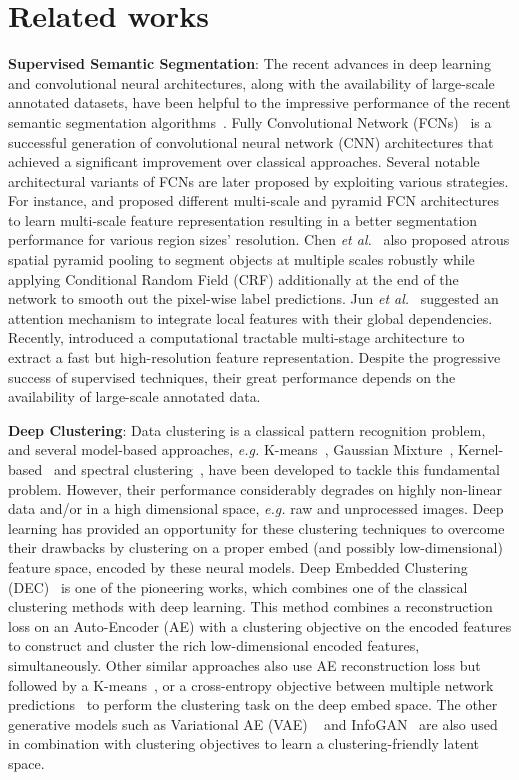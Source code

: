\documentclass[letterpaper, 10 pt, journal, twoside]{IEEEtran}
\newcommand{\eg}{\emph{e.g.}\xspace}
\newcommand{\etal}{\emph{et al.}\xspace}
\begin{document}
\section{Related works} \label{sec:ReWo}
\textbf{Supervised Semantic Segmentation}: The recent advances in deep learning and convolutional neural architectures, along with the availability of large-scale annotated datasets, have been helpful to the impressive performance of the recent semantic segmentation algorithms~\cite{ReviewSS2020}. Fully Convolutional Network (FCNs)~\cite{FCN} is a successful generation of convolutional neural network (CNN) architectures that achieved a significant improvement over classical approaches. Several notable architectural variants of FCNs are later proposed by exploiting various strategies. For instance, \cite{RefineNet} and \cite{PSPNet} proposed different multi-scale and pyramid FCN architectures to learn multi-scale feature representation resulting in a better segmentation performance for various region sizes' resolution. Chen \etal~\cite{DeepLab} also proposed atrous spatial pyramid pooling to segment objects at multiple scales robustly while applying Conditional Random Field (CRF) additionally at the end of the network to smooth out the pixel-wise label predictions. Jun \etal~\cite{DANet} suggested an attention mechanism to integrate local features with their global dependencies. Recently, \cite{HRNet} introduced a computational tractable multi-stage architecture to extract a fast but high-resolution feature representation. Despite the progressive success of supervised techniques, their great performance depends on the availability of large-scale annotated data.\par

\textbf{Deep Clustering}: 
Data clustering is a classical pattern recognition problem, and several model-based approaches, \eg K-means~\cite{He_2013_CVPR}, Gaussian Mixture~\cite{GMM-Cl},  Kernel-based~\cite{NIPS2004_2602} and spectral clustering~\cite{On-spectral-clustering}, have been developed to tackle this fundamental problem. However, their performance considerably degrades on highly non-linear data and/or in a high dimensional space, \eg raw and unprocessed images. Deep learning has provided an opportunity for these clustering techniques to overcome their drawbacks by clustering on a proper embed (and possibly low-dimensional) feature space, encoded by these neural models. Deep Embedded Clustering (DEC)~\cite{DEC} is one of the pioneering works, which combines one of the classical clustering methods with deep learning. This method combines a reconstruction loss on an Auto-Encoder (AE) with a clustering objective on the encoded features to construct and cluster the rich low-dimensional encoded features, simultaneously. Other similar approaches also use AE reconstruction loss but followed by a K-means~\cite{kmean+AE}, or a cross-entropy objective between multiple network predictions~\cite{AE+CE} to perform the clustering task on the deep embed space. The other generative models such as Variational AE (VAE) ~\cite{VaDE} and InfoGAN~\cite{InfoGAN} are also used in combination with clustering objectives to learn a clustering-friendly latent space. 
\end{document}
